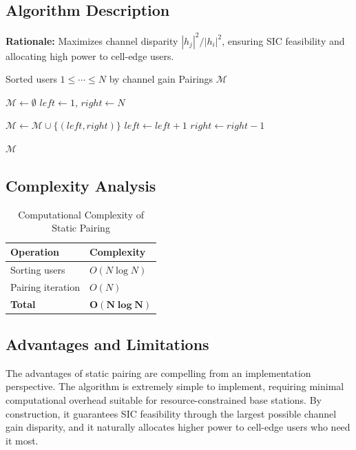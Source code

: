 \subsection{Algorithm Description}

\textbf{Rationale:} Maximizes channel disparity $|h_j|^2 / |h_i|^2$, ensuring SIC feasibility and allocating high power to cell-edge users.

\begin{algorithm}[H]
\caption{Static Pairing}
\label{alg:static}
\begin{algorithmic}[1]
\Require Sorted users $1 \leq \cdots \leq N$ by channel gain
\Ensure Pairings $\mathcal{M}$

\State $\mathcal{M} \gets \emptyset$
\State $left \gets 1$, $right \gets N$

    \State $\mathcal{M} \gets \mathcal{M} \cup \{(left, right)\}$
    \State $left \gets left + 1$
    \State $right \gets right - 1$
\EndWhile

\State \Return $\mathcal{M}$
\end{algorithmic}
\end{algorithm}

\subsection{Complexity Analysis}

\begin{table}[H]
\centering
\begin{tabular}{ll}
\toprule
\textbf{Operation} & \textbf{Complexity} \\
\midrule
Sorting users & $O(N \log N)$ \\
Pairing iteration & $O(N)$ \\
\textbf{Total} & $\boldsymbol{O(N \log N)}$ \\
\bottomrule
\end{tabular}
\caption{Computational Complexity of Static Pairing}
\end{table}

\subsection{Advantages and Limitations}

The advantages of static pairing are compelling from an implementation perspective. The algorithm is extremely simple to implement, requiring minimal computational overhead suitable for resource-constrained base stations. By construction, it guarantees SIC feasibility through the largest possible channel gain disparity, and it naturally allocates higher power to cell-edge users who need it most.

